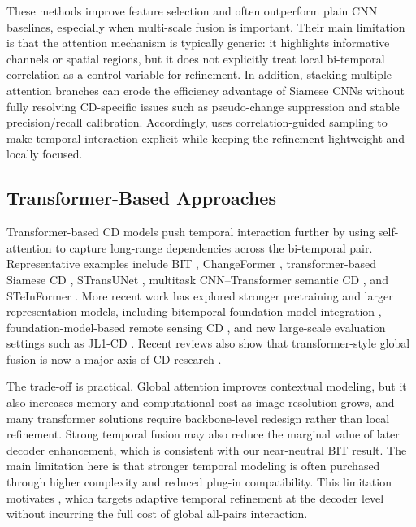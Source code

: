 These methods improve feature selection and often outperform plain CNN baselines, especially when multi-scale fusion is important. Their main limitation is that the attention mechanism is typically generic: it highlights informative channels or spatial regions, but it does not explicitly treat local bi-temporal correlation as a control variable for refinement. In addition, stacking multiple attention branches can erode the efficiency advantage of Siamese CNNs without fully resolving CD-specific issues such as pseudo-change suppression and stable precision/recall calibration. Accordingly, \cosa{} uses correlation-guided sampling to make temporal interaction explicit while keeping the refinement lightweight and locally focused.

\subsection{Transformer-Based Approaches}
Transformer-based CD models push temporal interaction further by using self-attention to capture long-range dependencies across the bi-temporal pair. Representative examples include BIT \cite{chen2022bit}, ChangeFormer \cite{bandara2022changeformer}, transformer-based Siamese CD \cite{w2022}, STransUNet \cite{jianghua2022}, multitask CNN--Transformer semantic CD \cite{wei2024}, and STeInFormer \cite{xiaowen2024}. More recent work has explored stronger pretraining and larger representation models, including bitemporal foundation-model integration \cite{chen2023time}, foundation-model-based remote sensing CD \cite{10438490}, and new large-scale evaluation settings such as JL1-CD \cite{liu2025jl1}. Recent reviews also show that transformer-style global fusion is now a major axis of CD research \cite{devansh2025,kamalakar2025}.

The trade-off is practical. Global attention improves contextual modeling, but it also increases memory and computational cost as image resolution grows, and many transformer solutions require backbone-level redesign rather than local refinement. Strong temporal fusion may also reduce the marginal value of later decoder enhancement, which is consistent with our near-neutral BIT result. The main limitation here is that stronger temporal modeling is often purchased through higher complexity and reduced plug-in compatibility. This limitation motivates \cosa{}, which targets adaptive temporal refinement at the decoder level without incurring the full cost of global all-pairs interaction.

